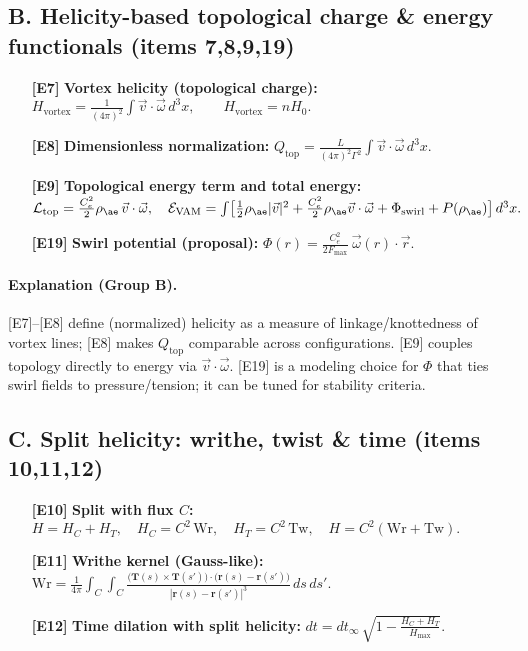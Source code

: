 \documentclass[11pt]{article}
\begin{document}
    \subsection{B. Helicity-based topological charge \& energy functionals (items 7,8,9,19)}
    \begin{enumerate}
        \item[\textbf{[E7]}] \textbf{Vortex helicity (topological charge):}\quad
        \(\displaystyle H_{\text{vortex}}=\frac{1}{(4\pi)^2}\int \vec v\cdot\vec\omega\,d^3x,\qquad H_{\text{vortex}}=nH_0.\)
        \item[\textbf{[E8]}] \textbf{Dimensionless normalization:}\quad
        \(\displaystyle Q_{\text{top}}=\frac{L}{(4\pi)^2\Gamma^2}\int \vec v\cdot\vec\omega\,d^3x.\)
        \item[\textbf{[E9]}] \textbf{Topological energy term and total energy:}\quad
        \(\mathcal{L}_{\text{top}}=\frac{C_e^2}{2}\rho_{\ae}\,\vec v\cdot\vec\omega,\quad
        \mathcal{E}_{\text{VAM}}=\int\!\big[\tfrac12\rho_{\ae}|\vec v|^2+\tfrac{C_e^2}{2}\rho_{\ae}\vec v\cdot\vec\omega+\Phi_{\text{swirl}}+P(\rho_{\ae})\big]\,d^3x.\)
        \item[\textbf{[E19]}] \textbf{Swirl potential (proposal):}\quad
        \(\displaystyle \Phi(r)=\frac{C_e^2}{2F_{\max}}\ \vec\omega(r)\cdot\vec r.\)
    \end{enumerate}

    \paragraph{Explanation (Group B).}
    [E7]–[E8] define (normalized) helicity as a measure of linkage/knottedness of vortex lines; [E8] makes \(Q_{\text{top}}\) comparable across configurations.
    [E9] couples topology directly to energy via \(\vec v\cdot\vec\omega\).
    [E19] is a modeling choice for \(\Phi\) that ties swirl fields to pressure/tension; it can be tuned for stability criteria.

    \subsection{C. Split helicity: writhe, twist \& time (items 10,11,12)}
    \begin{enumerate}
        \item[\textbf{[E10]}] \textbf{Split with flux \(C\):}\quad
        \(H=H_C+H_T,\quad H_C=C^2\,\mathrm{Wr},\quad H_T=C^2\,\mathrm{Tw},\quad H=C^2(\mathrm{Wr}+\mathrm{Tw}).\)
        \item[\textbf{[E11]}] \textbf{Writhe kernel (Gauss-like):}\quad
        \(\displaystyle \mathrm{Wr}=\frac{1}{4\pi}\int_C\!\!\int_C
        \frac{\big(\mathbf T(s)\times \mathbf T(s')\big)\cdot\big(\mathbf r(s)-\mathbf r(s')\big)}
        {|\mathbf r(s)-\mathbf r(s')|^3}\,ds\,ds'.\)
        \item[\textbf{[E12]}] \textbf{Time dilation with split helicity:}\quad
        \(\displaystyle dt=dt_\infty\,\sqrt{1-\frac{H_C+H_T}{H_{\max}}}.\)
    \end{enumerate}
\end{document}
